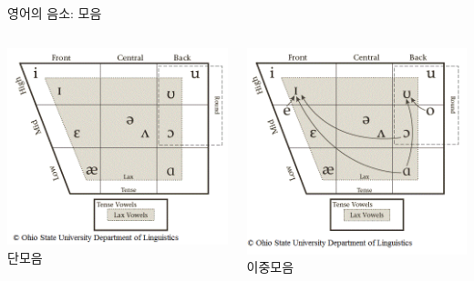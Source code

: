 \documentclass[11pt, aspectratio=169]{beamer}
\begin{document}
\begin{frame}[t]{영어의 음소: 모음}
    \begin{columns}
        \begin{column}{0.46\textwidth}
            \centering
            \includegraphics[width=1.0\textwidth]{img/English-monophthongs.png}\\
            단모음
        \end{column}
        \begin{column}{0.47\textwidth}
            \centering
            \includegraphics[width=1.0\textwidth]{img/English-diphthongs.png}\\
            이중모음            
        \end{column}
    \end{columns}

\end{frame}
\end{document}
